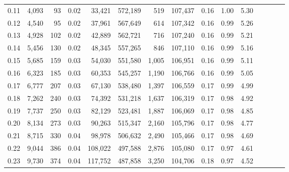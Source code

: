 \begin{tabular}{rrrcrrrrrrrrrrr}
0.11 &   4,093 &     93 &                                       0.02 &   33,421 &  572,189 &      519 &  107,437 &  0.16 &  1.00 &                         5.30 \\
0.12 &   4,540 &     95 &                                       0.02 &   37,961 &  567,649 &      614 &  107,342 &  0.16 &  0.99 &                         5.26 \\
0.13 &   4,928 &    102 &                                       0.02 &   42,889 &  562,721 &      716 &  107,240 &  0.16 &  0.99 &                         5.21 \\
0.14 &   5,456 &    130 &                                       0.02 &   48,345 &  557,265 &      846 &  107,110 &  0.16 &  0.99 &                         5.16 \\
0.15 &   5,685 &    159 &                                       0.03 &   54,030 &  551,580 &    1,005 &  106,951 &  0.16 &  0.99 &                         5.11 \\
0.16 &   6,323 &    185 &                                       0.03 &   60,353 &  545,257 &    1,190 &  106,766 &  0.16 &  0.99 &                         5.05 \\
0.17 &   6,777 &    207 &                                       0.03 &   67,130 &  538,480 &    1,397 &  106,559 &  0.17 &  0.99 &                         4.99 \\
0.18 &   7,262 &    240 &                                       0.03 &   74,392 &  531,218 &    1,637 &  106,319 &  0.17 &  0.98 &                         4.92 \\
0.19 &   7,737 &    250 &                                       0.03 &   82,129 &  523,481 &    1,887 &  106,069 &  0.17 &  0.98 &                         4.85 \\
0.20 &   8,134 &    273 &                                       0.03 &   90,263 &  515,347 &    2,160 &  105,796 &  0.17 &  0.98 &                         4.77 \\
0.21 &   8,715 &    330 &                                       0.04 &   98,978 &  506,632 &    2,490 &  105,466 &  0.17 &  0.98 &                         4.69 \\
0.22 &   9,044 &    386 &                                       0.04 &  108,022 &  497,588 &    2,876 &  105,080 &  0.17 &  0.97 &                         4.61 \\
0.23 &   9,730 &    374 &                                       0.04 &  117,752 &  487,858 &    3,250 &  104,706 &  0.18 &  0.97 &                         4.52 \\

\end{tabular}
